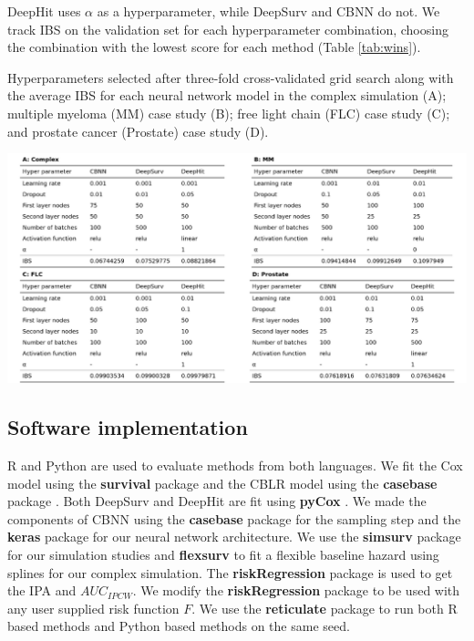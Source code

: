 \documentclass[preprint,12pt]{elsarticle}
\begin{document}
DeepHit uses $\alpha$ as a hyperparameter, while DeepSurv and CBNN do not. We track IBS on the validation set for each hyperparameter combination,
choosing the combination with the lowest score for each method (Table \ref{tab:wins}).

\begin{table}[H]
\caption{Hyperparameters selected after three-fold cross-validated grid search along with the average IBS for each neural network model in the
complex simulation (A); multiple myeloma (MM) case study (B); free light chain (FLC) case study (C); and prostate cancer (Prostate) case study (D).}
\label{tab:wins}
\begin{center}\includegraphics[width=1\linewidth]{figures/Table1.pdf} \end{center}
\end{table}

\hypertarget{software-implementation}{%
\subsection{Software implementation}\label{software-implementation}}

R \citep{Rsoft} and Python \citep{py} are used to evaluate methods from both languages. We fit the Cox model using the \textbf{survival} package
\citep{survpkg} and the CBLR model using the \textbf{casebase} package \citep{cbpkg}. Both DeepSurv and DeepHit are fit using \textbf{pyCox}
\citep{lee2018DeepHit}. We made the components of CBNN using the \textbf{casebase} package \citep{cbpkg} for the sampling step and the
\textbf{keras} package \citep{keras} for our neural network architecture. We use the \textbf{simsurv} package \citep{simsurv} for our simulation studies
and \textbf{flexsurv} \citep{flexsurv} to fit a flexible baseline hazard using splines for our complex simulation. The \textbf{riskRegression} package
\citep{riskRegression} is used to get the IPA and $AUC_{IPCW}$. We modify the \textbf{riskRegression} package to be used with any user supplied
risk function \(F\). We use the \textbf{reticulate} package \citep{reticulate} to run both R based methods and Python based methods on the same seed.
\end{document}
